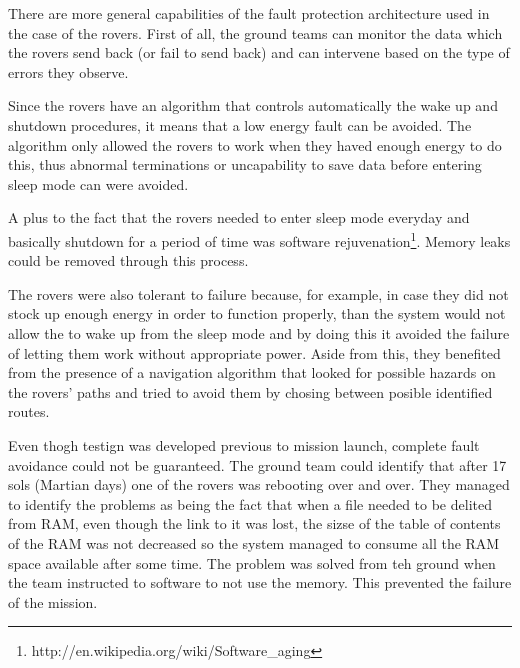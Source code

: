 There are more general capabilities of the fault protection architecture used in
the case of the rovers. First of all, the ground teams can monitor the data
which the rovers send back (or fail to send back) and can intervene based on the
type of errors they observe.

Since the rovers have an algorithm that controls automatically the wake up and
shutdown procedures, it means that a low energy fault can be avoided. The
algorithm only allowed the rovers to work when they haved enough energy to do
this, thus abnormal terminations or uncapability to save data before entering
sleep mode can were avoided. 

A plus to the fact that the rovers needed to enter sleep mode everyday and
basically shutdown for a period of time was software
rejuvenation\footnote{http://en.wikipedia.org/wiki/Software\_aging}. Memory
leaks could be removed through this process.

The rovers were also tolerant to failure because, for example, in case they did
not stock up enough energy in order to function properly, than the system would
not allow the to wake up from the sleep mode and by doing this it avoided the
failure of letting them work without appropriate power. Aside from this, they
benefited from the presence of a navigation algorithm that looked for possible
hazards on the rovers' paths and tried to avoid them by chosing between posible
identified routes.

Even thogh testign was developed previous to mission launch, complete fault
avoidance could not be guaranteed. The ground team could identify that after 17
sols (Martian days) one of the rovers was rebooting over and over. They managed
to identify the problems as being the fact that when a file needed to be delited
from RAM, even though the link to it was lost, the sizse of the table of
contents of the RAM was not decreased so the system managed to consume all the
RAM space available after some time. The problem was solved from teh ground when
the team instructed to software to not use the memory. This prevented the
failure of the mission.
